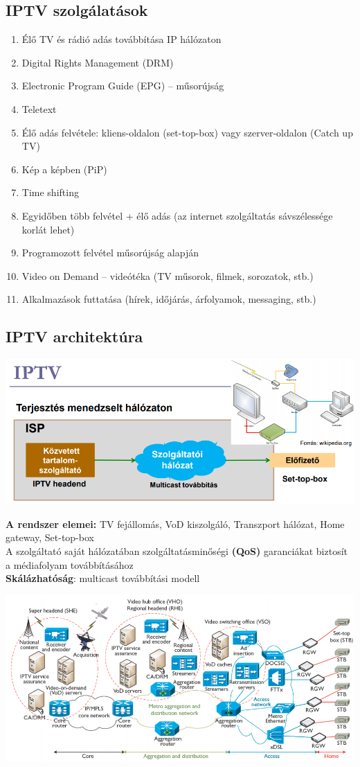 \documentclass[10pt,a4paper]{article}
\begin{document}
\subsection{IPTV szolgálatások}
\begin{enumerate}
	\item Élő TV és rádió adás továbbítása IP hálózaton
	\item Digital Rights Management (DRM)
	\item Electronic Program Guide (EPG) – műsorújság
	\item Teletext
	\item Élő adás felvétele: kliens-oldalon (set-top-box) vagy szerver-oldalon
	(Catch up TV)
	\item Kép a képben (PiP)
	\item Time shifting
	\item Egyidőben több felvétel + élő adás (az internet szolgáltatás
	sávszélessége korlát lehet)
	\item Programozott felvétel műsorújság alapján
	\item Video on Demand – videótéka (TV műsorok, filmek, sorozatok, stb.)
	\item Alkalmazások futtatása (hírek, időjárás, árfolyamok, messaging,
	stb.) 
\end{enumerate}
\subsection{IPTV architektúra}
\begin{center}
	\includegraphics[width=0.6\linewidth]{src/IPTV}
\end{center}
\textbf{A rendszer elemei:} TV fejállomás, VoD kiszolgáló, Transzport hálózat, Home gateway, Set-top-box\\
A szolgáltató saját hálózatában
szolgáltatásminőségi \textbf{(QoS)}
garanciákat biztosít a
médiafolyam továbbításához\\
\textbf{Skálázhatóság}: multicast
továbbítási modell
\begin{center}
	\includegraphics[width=0.6\linewidth]{src/IPTVmodell}
\end{center}
\end{document}
